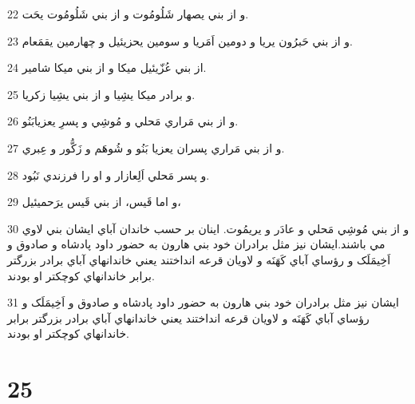\par 22 و از بني يصهار شَلُومُوت و از بني شَلُومُوت يحَت.
\par 23 و از بني حَبرُون يريا و دومين اَمَريا و سومين يحزيئيل و چهارمين يقمَعام.
\par 24 از بني عُزّيئيل ميکا و از بني ميکا شامير.
\par 25 و برادر ميکا يشِيا و از بني يشِيا زکريا.
\par 26 و از بني مَراري مَحلي و مُوشِي و پسرِ يعزيابَنُو.
\par 27 و از بني مَراري پسران يعزيا بَنُو و شُوهَم و زَکُّور و عِبري.
\par 28 و پسر مَحلي اَلِعازار و او را فرزندي نَبُود.
\par 29 و اما قَيس، از بني قَيس يرَحميئيل، 
\par 30 و از بني مُوشِي مَحلي و عادَر و يريمُوت. اينان بر حسب خاندان آباي ايشان بني لاوي مي باشند.ايشان نيز مثل برادران خود بني هارون به حضور داود پادشاه و صادوق و اَخِيمَلَک و رؤساي آباي کَهَنَه و لاويان قرعه انداختند يعني خاندانهاي آباي برادر بزرگتر برابر خاندانهاي کوچکتر او بودند.
\par 31 ايشان نيز مثل برادران خود بني هارون به حضور داود پادشاه و صادوق و اَخِيمَلَک و رؤساي آباي کَهَنَه و لاويان قرعه انداختند يعني خاندانهاي آباي برادر بزرگتر برابر خاندانهاي کوچکتر او بودند.
 
\chapter{25}

